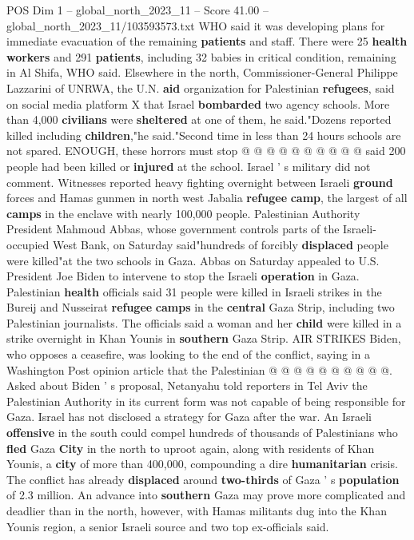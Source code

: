 \begin{textsample}{POS Dim 1 – global\_north\_2023\_11 – Score 41.00 – global\_north\_2023\_11/103593573.txt}
WHO said it was developing plans for immediate evacuation of the remaining \textbf{patients} and staff.
There were 25 \textbf{health} \textbf{workers} and 291 \textbf{patients}, including 32 babies in critical condition, remaining in Al Shifa, WHO said.
Elsewhere in the north, Commissioner-General Philippe Lazzarini of UNRWA, the U.N. \textbf{aid} organization for Palestinian \textbf{refugees}, said on social media platform X that Israel \textbf{bombarded} two agency schools.
More than 4,000 \textbf{civilians} were \textbf{sheltered} at one of them, he said."Dozens reported killed including \textbf{children},"he said."Second time in less than 24 hours schools are not spared.
ENOUGH, these horrors must stop @ @ @ @ @ @ @ @ @ @ said 200 people had been killed or \textbf{injured} at the school.
Israel ' s military did not comment.
Witnesses reported heavy fighting overnight between Israeli \textbf{ground} forces and Hamas gunmen in north west Jabalia \textbf{refugee} \textbf{camp}, the largest of all \textbf{camps} in the enclave with nearly 100,000 people.
Palestinian Authority President Mahmoud Abbas, whose government controls parts of the Israeli-occupied West Bank, on Saturday said"hundreds of forcibly \textbf{displaced} people were killed"at the two schools in Gaza.
Abbas on Saturday appealed to U.S.
President Joe Biden to intervene to stop the Israeli \textbf{operation} in Gaza.
Palestinian \textbf{health} officials said 31 people were killed in Israeli strikes in the Bureij and Nusseirat \textbf{refugee} \textbf{camps} in the \textbf{central} Gaza Strip, including two Palestinian journalists.
The officials said a woman and her \textbf{child} were killed in a strike overnight in Khan Younis in \textbf{southern} Gaza Strip.
AIR STRIKES Biden, who opposes a ceasefire, was looking to the end of the conflict, saying in a Washington Post opinion article that the Palestinian @ @ @ @ @ @ @ @ @ @.
Asked about Biden ' s proposal, Netanyahu told reporters in Tel Aviv the Palestinian Authority in its current form was not capable of being responsible for Gaza.
Israel has not disclosed a strategy for Gaza after the war.
An Israeli \textbf{offensive} in the south could compel hundreds of thousands of Palestinians who \textbf{fled} Gaza \textbf{City} in the north to uproot again, along with residents of Khan Younis, a \textbf{city} of more than 400,000, compounding a dire \textbf{humanitarian} crisis.
The conflict has already \textbf{displaced} around \textbf{two-thirds} of Gaza ' s \textbf{population} of 2.3 million.
An advance into \textbf{southern} Gaza may prove more complicated and deadlier than in the north, however, with Hamas militants dug into the Khan Younis region, a senior Israeli source and two top ex-officials said.

\end{textsample}

